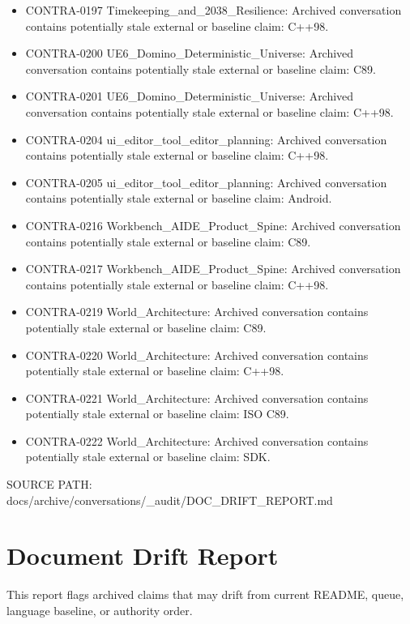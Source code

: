 \documentclass[11pt,a4paper]{report}
\begin{document}
\begin{itemize}
\item CONTRA-0197 Timekeeping\_and\_2038\_Resilience: Archived conversation contains potentially stale external or baseline claim: C++98.
\item CONTRA-0200 UE6\_Domino\_Deterministic\_Universe: Archived conversation contains potentially stale external or baseline claim: C89.
\item CONTRA-0201 UE6\_Domino\_Deterministic\_Universe: Archived conversation contains potentially stale external or baseline claim: C++98.
\item CONTRA-0204 ui\_editor\_tool\_editor\_planning: Archived conversation contains potentially stale external or baseline claim: C++98.
\item CONTRA-0205 ui\_editor\_tool\_editor\_planning: Archived conversation contains potentially stale external or baseline claim: Android.
\item CONTRA-0216 Workbench\_AIDE\_Product\_Spine: Archived conversation contains potentially stale external or baseline claim: C89.
\item CONTRA-0217 Workbench\_AIDE\_Product\_Spine: Archived conversation contains potentially stale external or baseline claim: C++98.
\item CONTRA-0219 World\_Architecture: Archived conversation contains potentially stale external or baseline claim: C89.
\item CONTRA-0220 World\_Architecture: Archived conversation contains potentially stale external or baseline claim: C++98.
\item CONTRA-0221 World\_Architecture: Archived conversation contains potentially stale external or baseline claim: ISO C89.
\item CONTRA-0222 World\_Architecture: Archived conversation contains potentially stale external or baseline claim: SDK.
\end{itemize}



{\small\raggedright SOURCE PATH: docs/\allowbreak{}archive/\allowbreak{}conversations/\allowbreak{}\_\allowbreak{}audit/\allowbreak{}DOC\_\allowbreak{}DRIFT\_\allowbreak{}REPORT.md\par}


\section{Document Drift Report}

This report flags archived claims that may drift from current README, queue, language baseline, or authority order.
\end{document}
